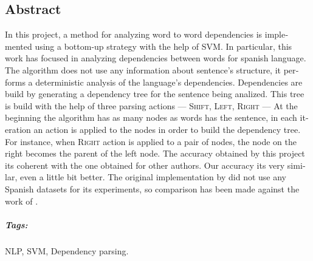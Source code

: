 \begin{otherlanguage}{american}
  \chapter*{Abstract}
  In this project, a method for analyzing word to word dependencies is
  implemented using a bottom-up strategy with the help of \acf{SVM}. In
  particular, this work has focused in analyzing dependencies between words for
  spanish language. The algorithm does not use any information about sentence's
  structure, it performs a deterministic analysis of the language's
  dependencies. Dependencies are build by generating a dependency tree for the
  sentence being analized. This tree is build with the help of three parsing
  actions --- \textsc{Shift, Left, Right} --- At the beginning the algorithm has
  as many nodes as words has the sentence, in each iteration an action is
  applied to the nodes in order to build the dependency tree. For instance, when
  \textsc{Right} action is applied to a pair of nodes, the node on the right
  becomes the parent of the left node. The accuracy obtained by this project its
  coherent with the one obtained for other authors. Our accuracy its very
  similar, even a little bit better. The original implementation by
  \citet{yamada2003} did not use any Spanish datasets for its experiments, so
  comparison has been made against the work of \citet{rohit2016}.
  
  \paragraph{Tags:} NLP, SVM, Dependency parsing.
\end{otherlanguage}

\endgroup			

\vfill